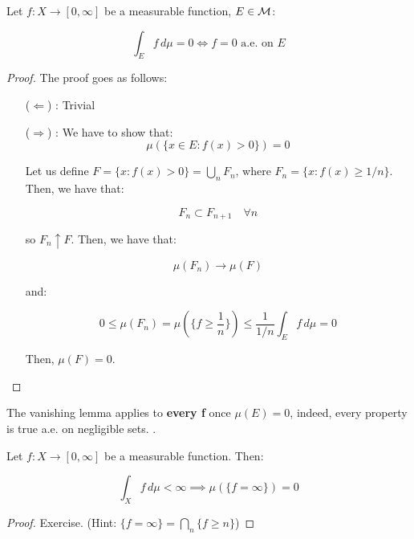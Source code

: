 \begin{flemma}
    Let $f: X \to [0, \infty]$ be a measurable function, $E \in \mathcal{M}$:

    $$\int_{E} f \, d\mu = 0 \iff f = 0 \text{ a.e. on } E$$
\end{flemma}

\begin{proof}
    The proof goes as follows:

    \begin{itemize}
        \item[($\Leftarrow$)]: Trivial
        
        \item[($\Rightarrow$)]: We have to show that:
        $$\mu(\{x \in E: f(x) > 0\}) = 0$$

        Let us define $F = \{x: f(x) > 0\} = \bigcup_{n} F_n$, where $F_n = \{x: f(x) \geq 1/n\}$.
        Then, we have that:

        $$F_n \subset F_{n+1} \quad \forall n$$

        so $F_n \uparrow F$. Then, we have that:

        $$\mu(F_n) \to \mu(F)$$

        and:

        $$ 0 \leq \mu(F_n) = \mu(\{f \geq \frac{1}{n}\}) \leq \frac{1}{1/n} \int_{E} f \, d\mu = 0$$

        Then, $\mu(F) = 0$.

    \end{itemize}
\end{proof}

\begin{fremark}
    The vanishing lemma applies to \textbf{every f} once $\mu(E) = 0$, indeed, every property
    is true a.e. on negligible sets. .
\end{fremark}

\begin{flemma}
    Let $f: X \to [0, \infty]$ be a measurable function. Then:

    $$\int_X f \, d\mu < \infty \implies \mu(\{f = \infty\}) = 0$$
\end{flemma}

\begin{proof}
    Exercise. (Hint: $\{f = \infty\} = \bigcap_n \{f \geq n\}$)
\end{proof}

